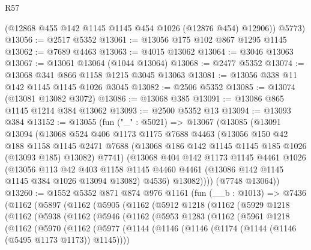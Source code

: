 \begin{lexlean}{R57}
\begin{coremodule}
        (@12868 @455 @142 @1145 @1145 @454 @1026 (@12876 @454) @12906))
      @5773)
@13056 := @2517 @5352
@13061 := @13056 @175 @102 @867 @1295 @1145
@13062 := @7689 @4463
@13063 := @4015 @13062
@13064 := @3046 @13063
@13067 := @13061 @13064 (@1044 @13064)
@13068 := @2477 @5352
@13074 := @13068 @341 @866 @1158 @1215 @3045 @13063
@13081 := @13056 @338 @11 @142 @1145 @1145 @1026 @3045
@13082 := @2506 @5352
@13085 := @13074 (@13081 @13082 @3072)
@13086 := @13068 @385
@13091 := @13086 @865 @1145 @1214 @384 @13062
@13093 := @2500 @5352 @13
@13094 := @13093 @384
@13152 := @13055
    (fun ("_" : @5021) =>
    @13067
      (@13085
        (@13091
          @13094
          (@13068
            @524
            @406
            @1173
            @1175
            @7688
            @4463
            (@13056
              @150
              @42
              @188
              @1158
              @1145
              @2471
              @7688
              (@13068 @186 @142 @1145 @1145 @185 @1026 (@13093 @185) @13082)
              @7741)
            (@13068
              @404
              @142
              @1173
              @1145
              @4461
              @1026
              (@13056
                @113
                @42
                @403
                @1158
                @1145
                @4460
                @4461
                (@13086 @142 @1145 @1145 @384 @1026 @13094 @13082)
                @4536)
              @13082))))
      (@7748 @13064))
@13260 := @1552
    @5352
    @871
    @874
    @976
    @1161
    (fun (__b : @1013) =>
    @7436
      (@1162
        (@5897
          (@1162
            (@5905
              (@1162
                (@5912
                  @1218
                  (@1162
                    (@5929
                      @1218
                      (@1162
                        (@5938
                          (@1162
                            (@5946
                              (@1162
                                (@5953
                                  @1283
                                  (@1162
                                    (@5961
                                      @1218
                                      (@1162
                                        (@5970
                                          (@1162
                                            (@5977
                                              (@1144
                                                (@1146
                                                  (@1146
                                                    (@1174
                                                      (@1144 (@1146 (@5495 @1173 @1173)) @1145))))

\end{coremodule}
\end{lexlean}
